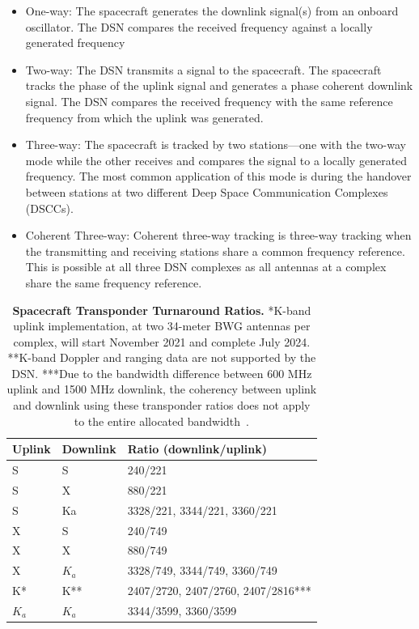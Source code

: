 \begin{itemize}
    \item One-way: The spacecraft generates the downlink signal(s) from an
    onboard oscillator. The DSN compares the received frequency against a
    locally generated frequency
    \item Two-way: The DSN transmits a signal to the spacecraft. The spacecraft
    tracks the phase of the uplink signal and generates a phase coherent
    downlink signal. The DSN compares the received frequency with the same
    reference frequency from which the uplink was generated.
    \item Three-way: The spacecraft is tracked by two stations—one with the
    two-way mode while the other receives and compares the signal to a locally
    generated frequency. The most common application of this mode is during the
    handover between stations at two different Deep Space Communication
    Complexes (DSCCs).
    \item Coherent Three-way: Coherent three-way tracking is three-way tracking
    when the transmitting and receiving stations share a common frequency
    reference. This is possible at all three DSN complexes as all antennas at a
    complex share the same frequency reference.
\end{itemize}


\begin{table}[htp]
\renewcommand{\arraystretch}{1.5}
\centering
\caption{
    \textbf{Spacecraft Transponder Turnaround Ratios.} *K-band uplink
    implementation, at two 34-meter BWG antennas per complex, will start
    November 2021 and complete July 2024. **K-band Doppler and ranging data are
    not supported by the DSN. ***Due to the bandwidth difference between 600 MHz
    uplink and 1500 MHz downlink, the coherency between uplink and downlink
    using these transponder ratios does not apply to the entire allocated
    bandwidth~\cite{Berner2020}.
}
\begin{tabular}{lll}
\hline
\textbf{Uplink} & \textbf{Downlink} & \textbf{Ratio (downlink/uplink)}  \\
\hline\hline
S               & S                 & 240/221                           \\
S               & X                 & 880/221                           \\
S               & Ka                & 3328/221, 3344/221, 3360/221      \\
X               & S                 & 240/749                           \\
X               & X                 & 880/749                           \\
X               & $K_a$             & 3328/749, 3344/749, 3360/749      \\
K*              & K**               & 2407/2720, 2407/2760, 2407/2816***\\
$K_a$           & $K_a$             & 3344/3599, 3360/3599              \\
\hline
\end{tabular}
\end{table}

